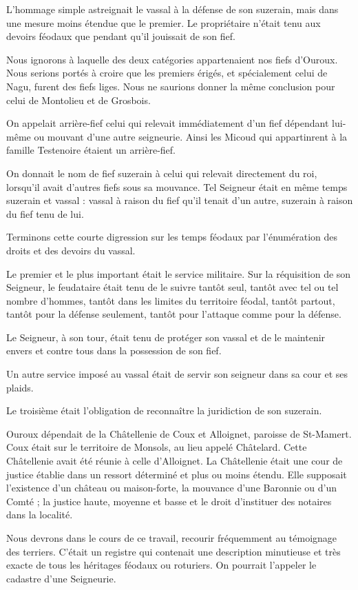 \documentclass[11pt,a4paper]{report}
\begin{document}
L'hommage simple astreignait le vassal à la défense de son suzerain, mais dans
une mesure moins étendue que le premier. Le propriétaire n'était tenu aux devoirs
féodaux que pendant qu'il jouissait de son fief.

Nous ignorons à laquelle des deux catégories appartenaient nos fiefs d'Ouroux.
Nous serions portés à croire que les premiers érigés, et spécialement celui de
Nagu, furent des fiefs liges. Nous ne saurions donner la même conclusion pour
celui de Montolieu et de Grosbois.

On appelait arrière-fief celui qui relevait immédiatement d'un fief dépendant
lui-même ou mouvant d'une autre seigneurie. Ainsi les Micoud qui appartinrent à
la famille Testenoire étaient un arrière-fief.

On donnait le nom de fief suzerain à celui qui relevait directement du roi,
lorsqu'il avait d'autres fiefs sous sa mouvance. Tel Seigneur était en même
temps suzerain et vassal : vassal à raison du fief qu'il tenait d'un autre,
suzerain à raison du fief tenu de lui.

Terminons cette courte digression sur les temps féodaux par l'énumération des
droits et des devoirs du vassal.

Le premier et le plus important était le service militaire. Sur la réquisition
de son Seigneur, le feudataire était tenu de le suivre tantôt seul, tantôt avec
tel ou tel nombre d'hommes, tantôt dans les limites du territoire féodal, tantôt
partout, tantôt pour la défense seulement, tantôt pour l'attaque comme pour la
défense.

Le Seigneur, à son tour, était tenu de protéger son vassal et de le maintenir
envers et contre tous dans la possession de son fief.

Un autre service imposé au vassal était de servir son seigneur dans sa cour et
ses plaids.

Le troisième était l'obligation de reconnaître la juridiction de son suzerain.

Ouroux dépendait de la Châtellenie de Coux et Alloignet, paroisse de St-Mamert.
Coux était sur le territoire de Monsols, au lieu appelé Châtelard. Cette
Châtellenie avait été réunie à celle d'Alloignet. La Châtellenie était une cour
de justice établie dans un ressort déterminé et plus ou moins étendu. Elle
supposait l'existence d'un château ou maison-forte, la mouvance d'une Baronnie ou
d'un Comté ; la justice haute, moyenne et basse et le droit d'instituer des
notaires dans la localité.

Nous devrons dans le cours de ce travail, recourir fréquemment au témoignage des
terriers. C'était un registre qui contenait une description minutieuse et très
exacte de tous les héritages féodaux ou roturiers. On pourrait l'appeler le
cadastre d'une Seigneurie.
\end{document}
